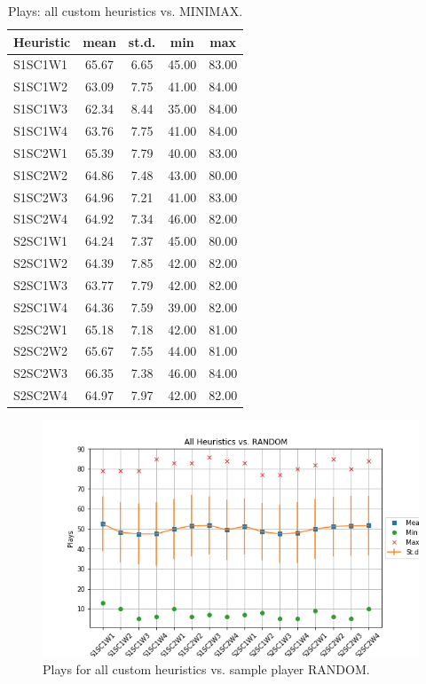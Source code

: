 \documentclass[a4paper]{article}
\begin{document}
    \begin{table}[htpb]
    \caption{ Plays: all custom heuristics vs. MINIMAX.}
    \centering
    \begin{tabular}{ l | c c c c }
    Heuristic & mean & st.d. & min & max \\ \hline 
    S1SC1W1 & 65.67 & 6.65 & 45.00 & 83.00 \\
    S1SC1W2 & 63.09 & 7.75 & 41.00 & 84.00 \\
    S1SC1W3 & 62.34 & 8.44 & 35.00 & 84.00 \\
    S1SC1W4 & 63.76 & 7.75 & 41.00 & 84.00 \\
    S1SC2W1 & 65.39 & 7.79 & 40.00 & 83.00 \\
    S1SC2W2 & 64.86 & 7.48 & 43.00 & 80.00 \\
    S1SC2W3 & 64.96 & 7.21 & 41.00 & 83.00 \\
    S1SC2W4 & 64.92 & 7.34 & 46.00 & 82.00 \\
    S2SC1W1 & 64.24 & 7.37 & 45.00 & 80.00 \\
    S2SC1W2 & 64.39 & 7.85 & 42.00 & 82.00 \\
    S2SC1W3 & 63.77 & 7.79 & 42.00 & 82.00 \\
    S2SC1W4 & 64.36 & 7.59 & 39.00 & 82.00 \\
    S2SC2W1 & 65.18 & 7.18 & 42.00 & 81.00 \\
    S2SC2W2 & 65.67 & 7.55 & 44.00 & 81.00 \\
    S2SC2W3 & 66.35 & 7.38 & 46.00 & 84.00 \\
    S2SC2W4 & 64.97 & 7.97 & 42.00 & 82.00 
    \end{tabular}
    \label{tabplaysMINIMAX}
    \end{table}

    


\begin{figure}[htpb]
\begin{center}
\includegraphics[width=1\columnwidth]{fig/results_Plays_All_vs_RANDOM.png}
\caption{Plays for all custom heuristics vs. sample player RANDOM.}
\end{center}
\label{figplyesRANDOM}
\end{figure}
    
\end{document}
